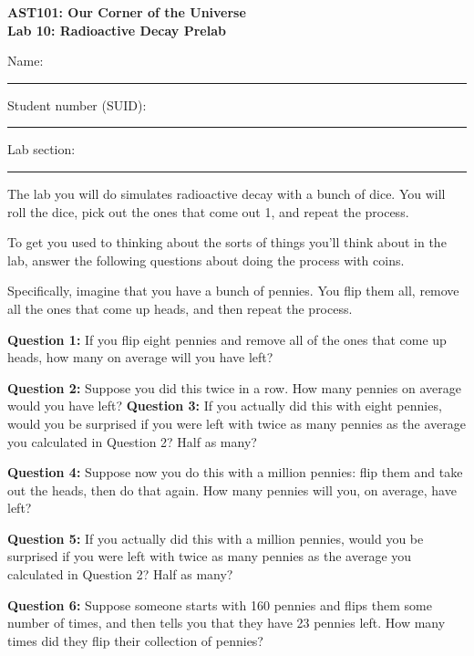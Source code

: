 \documentclass[11pt]{article}
\begin{document}
\begin{center}
\textbf{\Large
AST101: Our Corner of the Universe \\
\vspace*{0.1cm}
Lab 10: Radioactive Decay Prelab
}
\end{center}

\vspace*{0.5cm}

{\Large Name:}\vspace*{0.5cm}\\\hrule
{\Large Student number (SUID):}\vspace*{0.5cm}\\\hrule
{\Large Lab section:}\vspace*{0.5cm}\\\hrule
\vspace*{0.5cm}


The lab you will do simulates radioactive decay with a bunch of dice. You will roll the dice, pick out the ones that come
out 1, and repeat the process.

To get you used to thinking about the sorts of things you'll think about in the lab, answer the following questions
about doing the process with coins.

Specifically, imagine that you have a bunch of pennies. You flip them all, remove all the ones that come up heads, and 
then repeat the process.

{\bf Question 1:} If you flip eight pennies and remove all of the ones that come up heads, how many on average will you have
left?

\vspace{2in}

{\bf Question 2:} Suppose you did this twice in a row. How many pennies on average would you have left?
\vspace{2in}
\newpage
{\bf Question 3:} If you actually did this with eight pennies, would you be surprised if you were left with twice as many pennies as the average you calculated in Question 2? Half as many? 

\vspace{2in}

{\bf Question 4:} Suppose now you do this with a million pennies: flip them and take out the heads, then do that again. 
How many pennies will you, on average, have left?

\vspace{2in}

{\bf Question 5:} If you actually did this with a million pennies, would you be surprised if you were left with twice as many pennies as the average you calculated in Question 2? Half as many? 

\vspace{2in}

{\bf Question 6:} Suppose someone starts with 160 pennies and flips them some number of times, and then tells you that they
have 23 pennies left. How many times did they flip their collection of pennies?
\end{document}
